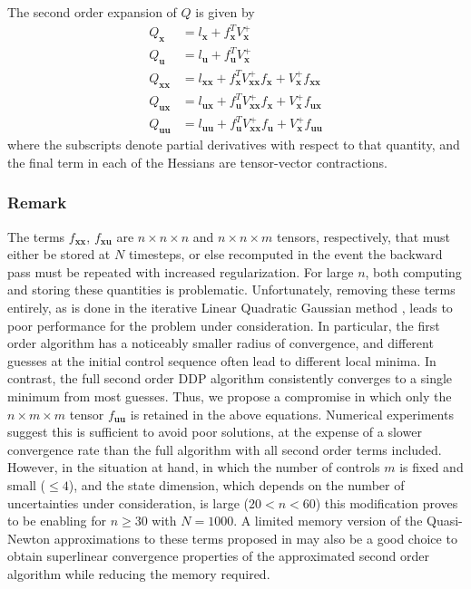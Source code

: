 \documentclass[journal ]{new-aiaa}
\newcommand{\state}{\ensuremath{\mathbf{x}}}
\newcommand{\control}{\ensuremath{\mathbf{u}}}
\begin{document}
The second order expansion of $ Q $ is given by
\begin{align}
Q_\state &= l_\state + f_\state^T V^+_\state \\
Q_\control &= l_\control + f_\control^T V^+_\state \\
Q_{\state\state} &= l_{\state\state} + f_\state^T V^+_{\state\state}f_\state + V^+_\state f_{\state\state} \\
Q_{\control\state} &= l_{\control\state} + f_\control^T V^+_{\state\state}f_\state + V^+_\state f_{\control\state} \\
Q_{\control\control} &= l_{\control\control} + f_\control^T V^+_{\state\state}f_\control + V^+_\state f_{\control\control}
\end{align}
where the subscripts denote partial derivatives with respect to that quantity, and the final term in each of the Hessians are tensor-vector contractions.
\subsubsection*{Remark} The terms $f_{\state\state},\, f_{\state\control}$ are $n\times n\times n$ and $n\times n\times m$ tensors, respectively, that must either be stored at $N$ timesteps, or else recomputed in the event the backward pass must be repeated with increased regularization. For large $n$, both computing and storing these quantities is problematic. Unfortunately, removing these terms entirely, as is done in the iterative Linear Quadratic Gaussian method \cite{iLQG}, leads to poor performance for the problem under consideration. In particular, the first order algorithm has a noticeably smaller radius of convergence, and different guesses at the initial control sequence often lead to different local minima. In contrast, the full second order DDP algorithm consistently converges to a single minimum from most guesses. Thus, we propose a compromise in which only the $n\times m \times m$ tensor $f_{\control\control}$ is retained in the above equations. Numerical experiments suggest this is sufficient to avoid poor solutions, at the expense of a slower convergence rate than the full algorithm with all second order terms included. However, in the situation at hand, in which the number of controls $m$ is fixed and small ($ \le4 $), and the state dimension, which depends on the number of uncertainties under consideration, is large ($20 < n <60$) this modification proves to be enabling for $n\ge 30$ with $N=1000$. A limited memory version of the Quasi-Newton approximations to these terms proposed in \cite{QNDDP} may also be a good choice to obtain superlinear convergence properties of the approximated second order algorithm while reducing the memory required. 
\end{document}
